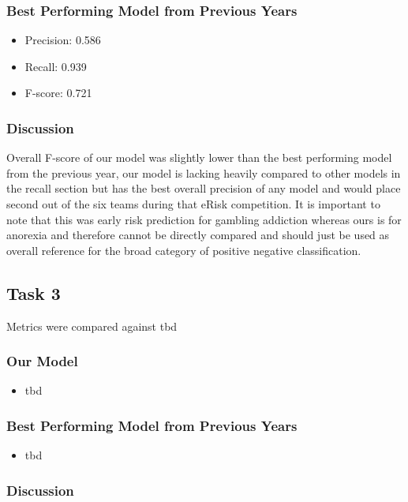 \documentclass[12pt, titlepage]{article}
\begin{document}
\subsubsection{Best Performing Model from Previous Years}
\begin{itemize}
    \item Precision: 0.586
    \item Recall: 0.939
    \item F-score: 0.721
\end{itemize}

\subsubsection{Discussion}
Overall F-score of our model was slightly lower than the best performing model from the previous year, our model is lacking heavily compared to other models in the recall section but has the best overall precision of any model and would place second out of the six teams during that eRisk competition. It is important to note that this was early risk prediction for gambling addiction whereas ours is for anorexia and therefore cannot be directly compared and should just be used as overall reference for the broad category of positive negative classification.

\subsection{Task 3}
Metrics were compared against tbd

\subsubsection{Our Model}
\begin{itemize}
\item tbd
\end{itemize}

\subsubsection{Best Performing Model from Previous Years}
\begin{itemize}
\item tbd
\end{itemize}

\subsubsection{Discussion}
\end{document}
